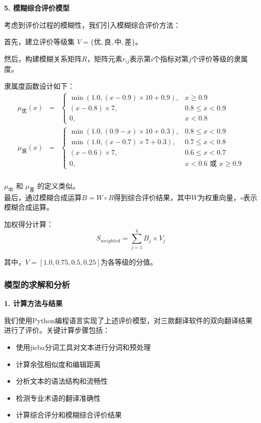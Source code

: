 \documentclass[bwprint]{cumcmthesis}
\begin{document}
\textbf{5. 模糊综合评价模型}

考虑到评价过程的模糊性，我们引入模糊综合评价方法：

首先，建立评价等级集 $V = \{\text{优}, \text{良}, \text{中}, \text{差}\}$。 

然后，构建模糊关系矩阵$R$，矩阵元素$r_{ij}$表示第$i$个指标对第$j$个评价等级的隶属度。

隶属度函数设计如下：
\begin{eqnarray} %
\mu_{\text{优}}(x) &=& %
\begin{cases}
\min(1.0, (x-0.9) \times 10 + 0.9), & x \geq 0.9 \\
(x-0.8) \times 7, & 0.8 \leq x < 0.9 \\
0, & x < 0.8
\end{cases} \\ %
\mu_{\text{良}}(x) &=& %
\begin{cases}
\min(1.0, (0.9-x) \times 10 + 0.3), & 0.8 \leq x < 0.9 \\
\min(1.0, (x-0.7) \times 7 + 0.3), & 0.7 \leq x < 0.8 \\
(x-0.6) \times 7, & 0.6 \leq x < 0.7 \\
0, & x < 0.6 \text{ 或 } x \geq 0.9
\end{cases} \\ %
\end{eqnarray}

$\mu_{\text{中}}$ 和 $\mu_{\text{差}}$ 的定义类似。 %
\\
最后，通过模糊合成运算$B = W \circ R$得到综合评价结果，其中$W$为权重向量，$\circ$表示模糊合成运算。

加权得分计算：
\begin{equation}
S_{weighted} = \sum_{j=1}^4 B_j \times V_j
\end{equation}

其中，$V = [1.0, 0.75, 0.5, 0.25]$为各等级的分值。

\subsubsection{模型的求解和分析}
\textbf{1. 计算方法与结果}

我们使用Python编程语言实现了上述评价模型，对三款翻译软件的双向翻译结果进行了评价。关键计算步骤包括：
\begin{itemize}
    \item 使用jieba分词工具对文本进行分词和预处理
    \item 计算余弦相似度和编辑距离
    \item 分析文本的语法结构和流畅性
    \item 检测专业术语的翻译准确性
    \item 计算综合评分和模糊综合评价结果
\end{itemize}
\end{document}
